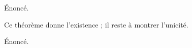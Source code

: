 \begin{theorem}
  Énoncé.
\end{theorem}

Ce théorème donne l'existence ; il reste à montrer l'unicité.

\begin{proposition}
  Énoncé.
\end{proposition}
